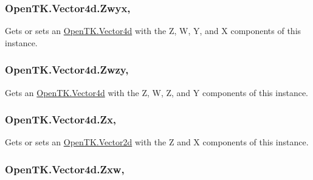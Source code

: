 \hypertarget{struct_open_t_k_1_1_vector4d_aa87578ae549f0135d03ceacb4c4de657}{
\subsubsection[{Zwyx}]{ Open\-T\-K.\-Vector4d.\-Zwyx\hspace{0.3cm}{\ttfamily [get]}, {\ttfamily [set]}}}\label{struct_open_t_k_1_1_vector4d_aa87578ae549f0135d03ceacb4c4de657}


Gets or sets an \hyperlink{struct_open_t_k_1_1_vector4d}{Open\-T\-K.\-Vector4d} with the Z, W, Y, and X components of this instance. 

\hypertarget{struct_open_t_k_1_1_vector4d_a7b494871928e7257d512760ea9106254}{
\subsubsection[{Zwzy}]{ Open\-T\-K.\-Vector4d.\-Zwzy\hspace{0.3cm}{\ttfamily [get]}, {\ttfamily [set]}}}\label{struct_open_t_k_1_1_vector4d_a7b494871928e7257d512760ea9106254}


Gets an \hyperlink{struct_open_t_k_1_1_vector4d}{Open\-T\-K.\-Vector4d} with the Z, W, Z, and Y components of this instance. 

\hypertarget{struct_open_t_k_1_1_vector4d_a4ba315f735bff80292c71d825f709923}{
\subsubsection[{Zx}]{ Open\-T\-K.\-Vector4d.\-Zx\hspace{0.3cm}{\ttfamily [get]}, {\ttfamily [set]}}}\label{struct_open_t_k_1_1_vector4d_a4ba315f735bff80292c71d825f709923}


Gets or sets an \hyperlink{struct_open_t_k_1_1_vector2d}{Open\-T\-K.\-Vector2d} with the Z and X components of this instance. 

\hypertarget{struct_open_t_k_1_1_vector4d_a1d73a5b92928bd51e510dd55d81577f2}{
\subsubsection[{Zxw}]{ Open\-T\-K.\-Vector4d.\-Zxw\hspace{0.3cm}{\ttfamily [get]}, {\ttfamily [set]}}}\label{struct_open_t_k_1_1_vector4d_a1d73a5b92928bd51e510dd55d81577f2}


